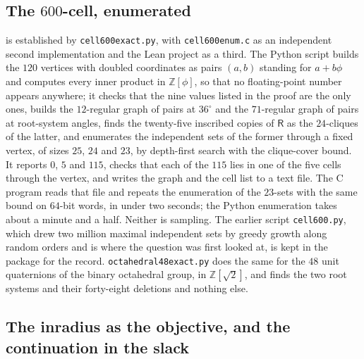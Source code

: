\documentclass[11pt,reqno]{amsart}
\renewcommand{\_}{\origunderscore\allowbreak}
\numberwithin{equation}{section}
\theoremstyle{plain}
\theoremstyle{definition}
\theoremstyle{remark}
\newcommand{\Rt}{\mathsf{R}}                 %
\begin{document}
\subsection*{The $600$-cell, enumerated}

 is established by \texttt{cell600\_exact.py}, with
\texttt{cell600\_enum.c} as an independent second implementation and
the Lean project as a third. The Python script builds the $120$ vertices
with doubled coordinates as pairs $(a,b)$ standing for $a+b\phi$ and
computes every inner product in $\mathbb{Z}[\phi]$, so that no
floating-point number appears anywhere; it checks that the nine values
listed in the proof are the only ones, builds the $12$-regular graph of
pairs at $36^\circ$ and the $71$-regular graph of pairs at root-system
angles, finds the twenty-five inscribed copies of $\Rt$ as the
$24$-cliques of the latter, and enumerates the independent sets of the
former through a fixed vertex, of sizes $25$, $24$ and $23$, by
depth-first search with the clique-cover bound. It reports $0$, $5$ and
$115$, checks that each of the $115$ lies in one of the five cells
through the vertex, and writes the graph and the cell list to a text
file. The C program reads that file and repeats the enumeration of the
$23$-sets with the same bound on $64$-bit words, in under two seconds;
the Python enumeration takes about a minute and a half. Neither is
sampling. The earlier script \texttt{cell600.py}, which drew two
million maximal independent sets by greedy growth along random orders
and is where the question was first looked at, is kept in the package
for the record. \texttt{octahedral48\_exact.py} does the same for the
$48$ unit quaternions of the binary octahedral group, in
$\mathbb{Z}[\sqrt2]$, and finds the two root systems and their
forty-eight deletions and nothing else.

\subsection*{The inradius as the objective, and the continuation in the slack}
\end{document}
